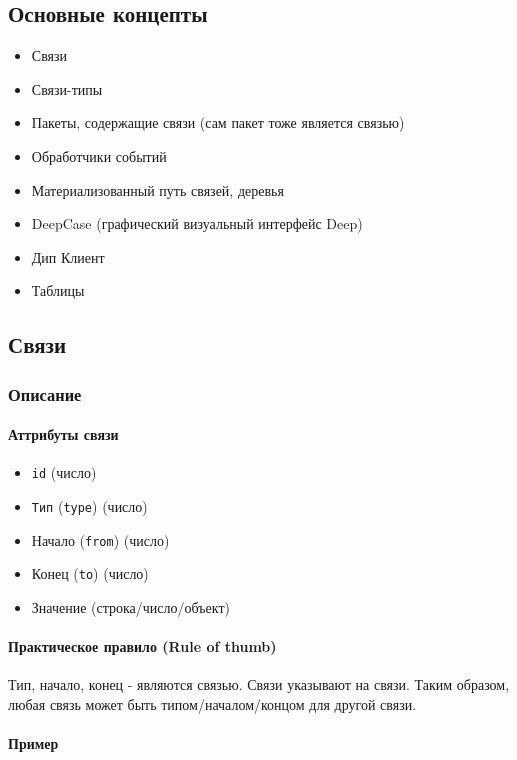 \documentclass{article}
\begin{document}
\subsection{Основные концепты}

\begin{itemize}
  \item Связи
  \item Связи-типы
  \item Пакеты, содержащие связи (сам пакет тоже является связью)
  \item Обработчики событий
  \item Материализованный путь связей, деревья
  \item DeepCase (графический визуальный интерфейс Deep)
  \item Дип Клиент
  \item Таблицы
\end{itemize}

\subsection{Связи}

\subsubsection{Описание}

\paragraph{Аттрибуты связи}

\begin{itemize}
  \item \texttt{id} (число)
  \item \texttt{Тип} (\texttt{type}) (число)
  \item Начало (\texttt{from}) (число)
  \item Конец (\texttt{to}) (число)
  \item Значение (строка/число/объект)
\end{itemize}

\paragraph{Практическое правило (Rule of thumb)}
Тип, начало, конец - являются связью. Связи указывают на связи. Таким образом, любая связь может быть типом/началом/концом для другой связи.

\paragraph{Пример}
\end{document}
